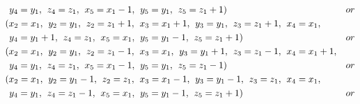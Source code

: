 \begin{align*}
&\hspace{1ex} y_{4}=y_{1},\hspace{1ex} z_{4}=z_{1},\hspace{1ex} x_{5}=x_{1}-1,\hspace{1ex} y_{5}=y_{1},\hspace{1ex} z_{5}=z_{1}+1)&or\\ 
&(x_{2}=x_{1},\hspace{1ex} y_{2}=y_{1},\hspace{1ex} z_{2}=z_{1}+1,\hspace{1ex} x_{3}=x_{1}+1,\hspace{1ex} y_{3}=y_{1},\hspace{1ex} z_{3}=z_{1}+1,\hspace{1ex} x_{4}=x_{1},\\
&\hspace{1ex} y_{4}=y_{1}+1,\hspace{1ex} z_{4}=z_{1},\hspace{1ex} x_{5}=x_{1},\hspace{1ex} y_{5}=y_{1}-1,\hspace{1ex} z_{5}=z_{1}+1)&or\\ 
&(x_{2}=x_{1},\hspace{1ex} y_{2}=y_{1},\hspace{1ex} z_{2}=z_{1}-1,\hspace{1ex} x_{3}=x_{1},\hspace{1ex} y_{3}=y_{1}+1,\hspace{1ex} z_{3}=z_{1}-1,\hspace{1ex} x_{4}=x_{1}+1,\\
&\hspace{1ex} y_{4}=y_{1},\hspace{1ex} z_{4}=z_{1},\hspace{1ex} x_{5}=x_{1}-1,\hspace{1ex} y_{5}=y_{1},\hspace{1ex} z_{5}=z_{1}-1)&or\\ 
&(x_{2}=x_{1},\hspace{1ex} y_{2}=y_{1}-1,\hspace{1ex} z_{2}=z_{1},\hspace{1ex} x_{3}=x_{1}-1,\hspace{1ex} y_{3}=y_{1}-1,\hspace{1ex} z_{3}=z_{1},\hspace{1ex} x_{4}=x_{1},\\
&\hspace{1ex} y_{4}=y_{1},\hspace{1ex} z_{4}=z_{1}-1,\hspace{1ex} x_{5}=x_{1},\hspace{1ex} y_{5}=y_{1}-1,\hspace{1ex} z_{5}=z_{1}+1)&or\\ 

\end{align*}
